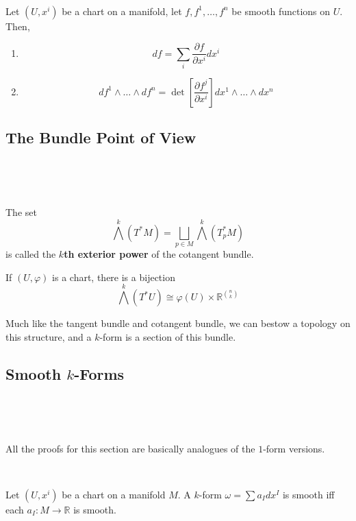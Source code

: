 \documentclass{article}
\begin{document}
\begin{corollary}
  \

  Let $(U, x^i)$ be a chart on a manifold, let $f, f^1, \dots, f^n$ be smooth functions on $U$. Then,
  \begin{enumerate}
    \item $$df = \sum_i \frac{\partial f}{\partial x^i} dx^i$$
    \item $$df^1 \wedge \dots \wedge df^n = \det[\frac{\partial f^j}{\partial x^i}] dx^1 \wedge \dots \wedge dx^n$$
  \end{enumerate}
\end{corollary}

\subsection{The Bundle Point of View}
\

\begin{definition}
  \

  The set $$\bigwedge^k(T^*M) = \bigsqcup_{p \in M} \bigwedge^k(T_p^*M)$$is called the \textbf{$k$th exterior power} of the cotangent bundle.

  If $(U, \varphi)$ is a chart, there is a bijection $$\bigwedge^k(T^*U) \cong \varphi(U) \times \mathbb{R}^\binom{n}{k}$$

  Much like the tangent bundle and cotangent bundle, we can bestow a topology on this structure, and a $k$-form is a section of this bundle.
\end{definition}

\subsection{Smooth $k$-Forms}
\

\begin{remark}
  \

  All the proofs for this section are basically analogues of the $1$-form versions.
\end{remark}

\begin{lemma}
  \

  Let $(U, x^i)$ be a chart on a manifold $M$. A $k$-form $\omega = \sum a_I dx^I$ is smooth iff each $a_I: M \to \mathbb{R}$ is smooth.
\end{lemma}
\end{document}
